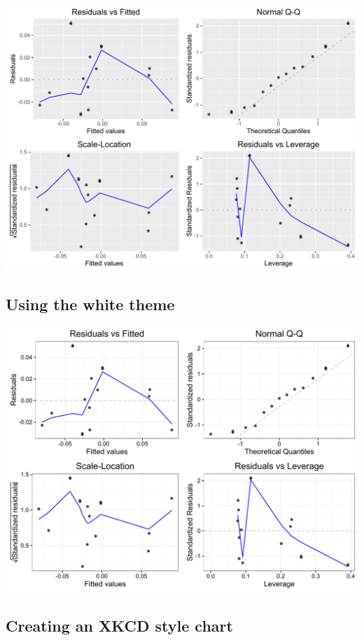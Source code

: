 \begin{center}\includegraphics[width=0.55\linewidth]{figures/lr_18-1} \end{center}

\subsection{Using the white theme}\label{using-the-white-theme-11}

\begin{Shaded}
\begin{Highlighting}[]
 \NormalTok{) +}\StringTok{ }\NormalTok{()}
\end{Highlighting}
\end{Shaded}

\begin{center}\includegraphics[width=0.55\linewidth]{figures/lr_19-1} \end{center}

\subsection{Creating an XKCD style
chart}\label{creating-an-xkcd-style-chart-11}

